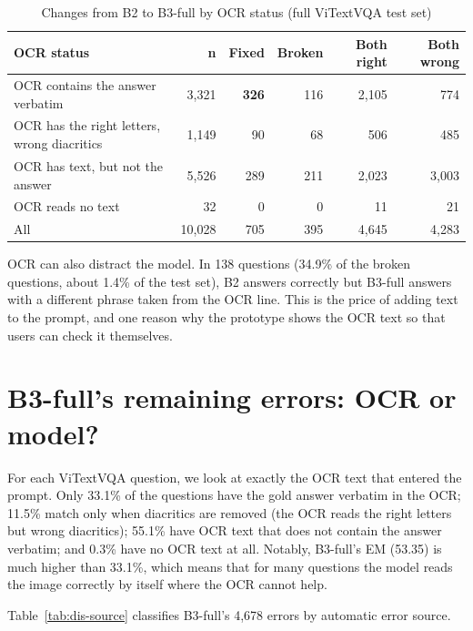 \begin{table}[htbp]
\caption{Changes from B2 to B3-full by OCR status (full ViTextVQA test set)}
\label{tab:dis-flips}
\centering
\small
\begin{tabular}{p{}rrrrr}
\toprule
\textbf{OCR status} & \textbf{n} & \textbf{Fixed} & \textbf{Broken} & \textbf{Both right} & \textbf{Both wrong} \\
\midrule
OCR contains the answer verbatim & 3,321 & \textbf{326} & 116 & 2,105 & 774 \\
OCR has the right letters, wrong diacritics & 1,149 & 90 & 68 & 506 & 485 \\
OCR has text, but not the answer & 5,526 & 289 & 211 & 2,023 & 3,003 \\
OCR reads no text & 32 & 0 & 0 & 11 & 21 \\
\midrule
All & 10,028 & 705 & 395 & 4,645 & 4,283 \\
\bottomrule
\end{tabular}
\end{table}

OCR can also distract the model. In 138 questions (34.9\% of the broken questions, about
1.4\% of the test set), B2 answers correctly but B3-full answers with a different phrase
taken from the OCR line. This is the price of adding text to the prompt, and one reason
why the prototype shows the OCR text so that users can check it themselves.

\section{B3-full's remaining errors: OCR or model?}
\label{sec:dis-remaining}

For each ViTextVQA question, we look at exactly the OCR text that entered the
prompt. Only 33.1\% of the questions have the gold answer verbatim in the OCR; 11.5\% match
only when diacritics are removed (the OCR reads the right letters but wrong diacritics);
55.1\% have OCR text that does not contain the answer verbatim; and 0.3\% have no OCR text
at all. Notably, B3-full's EM (53.35) is much higher than 33.1\%, which means that for many
questions the model reads the image correctly by itself where the OCR cannot help.

Table~\ref{tab:dis-source} classifies B3-full's 4,678 errors by automatic error source.


